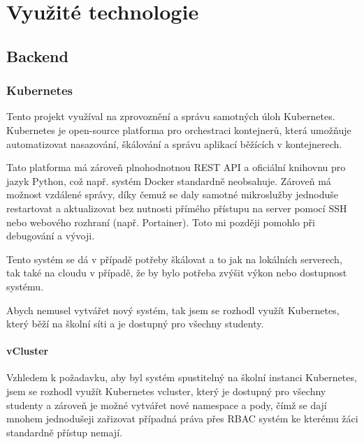 \documentclass[12pt, a4paper,
oneside,      %
openright
]{report}
\begin{document}

\chapter{Využité technologie}

\section{Backend}

\subsection{Kubernetes}
Tento projekt využíval na zprovoznění a správu samotných úloh Kubernetes. Kubernetes je open-source platforma pro orchestraci kontejnerů, která umožňuje automatizovat nasazování, škálování a správu aplikací běžících v kontejnerech. 

Tato platforma má zároveň plnohodnotnou REST API a oficiální knihovnu pro jazyk Python, což např. systém Docker standardně neobsahuje. Zároveň má možnost vzdálené správy, díky čemuž se daly samotné mikroslužby jednoduše restartovat a aktualizovat bez nutnosti přímého přístupu na server pomocí SSH nebo webového rozhraní (např. Portainer). Toto mi později pomohlo při debugování a vývoji.

Tento systém se dá v případě potřeby škálovat a to jak na lokálních serverech, tak také na cloudu v případě, že by bylo potřeba zvýšit výkon nebo dostupnost systému.

Abych nemusel vytvářet nový systém, tak jsem se rozhodl využít Kubernetes, který běží na školní síti a je dostupný pro všechny studenty.

\subsubsection{vCluster}
Vzhledem k požadavku, aby byl systém spustitelný na školní instanci Kubernetes, jsem se rozhodl využít Kubernetes vcluster, který je dostupný pro všechny studenty a zároveň je možné vytvářet nové namespace a pody, čímž se dají mnohem jednodušeji zařizovat případná práva přes RBAC systém ke kterému žáci standardně přístup nemají.
\end{document}
